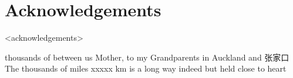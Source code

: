%
%
\chapter*{Acknowledgements}

<acknowledgements>






%
%

%
thousands of  between us
Mother, 
to my Grandparents in Auckland and 张家口
The thousands of miles
    xxxxx km is a long way indeed
    but held close to heart

